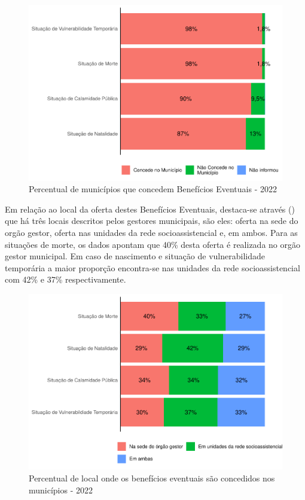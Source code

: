 \documentclass[
  brazilian]{report}
\begin{document}
\begin{figure}
\includegraphics{Censo-SUAS-2022_files/figure-latex/be-munic-1} \caption[Percentual de municípios que concedem Benefícios Eventuais - 2022]{Percentual de municípios que concedem Benefícios Eventuais - 2022}\label{fig:be-munic}
\end{figure}

Em relação ao local da oferta destes Benefícios Eventuais, destaca-se
através () que há três locais descritos pelos
gestores municipais, são eles: oferta na sede do orgão gestor, oferta
nas unidades da rede socioassistencial e, em ambos. Para as situações de
morte, os dados apontam que 40\% desta oferta é realizada no orgão
gestor municipal. Em caso de nascimento e situação de vulnerabilidade
temporária a maior proporção encontra-se nas unidades da rede
socioassistencial com 42\% e 37\% respectivamente.

\begin{figure}
\includegraphics{Censo-SUAS-2022_files/figure-latex/be-local-1} \caption[Percentual de local onde os benefícios eventuais são concedidos nos municípios - 2022]{Percentual de local onde os benefícios eventuais são concedidos nos municípios - 2022}\label{fig:be-local}
\end{figure}
\end{document}
